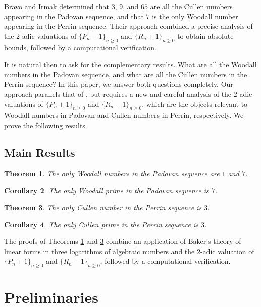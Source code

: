 \documentclass[11pt,a4paper]{article}
\newtheorem{theorem}{Theorem}[section]
\newtheorem{cor}[theorem]{Corollary}
\numberwithin{equation}{section}
\numberwithin{table}{section}
\numberwithin{figure}{section}
\begin{document}
Bravo and Irmak \cite{BrIrmak} determined that $3$, $9$, and $65$ are all the Cullen numbers appearing in the Padovan sequence, and that $7$ is the only Woodall number appearing in the Perrin sequence. Their approach combined a precise analysis of the $2$-adic valuations of 
$\{P_n - 1\}_{n\ge 0}$ and $\{R_n + 1\}_{n \ge 0}$ to obtain absolute bounds, followed by a computational verification.

It is natural then to ask for the complementary results. What are all the Woodall numbers in the Padovan sequence, and what are all the Cullen numbers in the Perrin sequence? In this paper, we answer both questions completely. Our approach parallels that of 
\cite{BrIrmak}, but requires a new and careful analysis of the $2$-adic valuations of $\{P_n + 1\}_{n\ge 0}$ and $\{R_n - 1\}_{n\ge 0}$, which 
are the objects relevant to Woodall numbers in Padovan and Cullen numbers in Perrin, respectively. We prove the following results.

\subsection{Main Results}

\begin{theorem}\label{thm:1}
	The only Woodall numbers in the Padovan sequence are $1$ and $7$.
\end{theorem}

\begin{cor}
The only Woodall prime in the Padovan sequence is $7$.
\end{cor}

\begin{theorem}\label{thm:2}
	The only Cullen number in the Perrin sequence is $3$.
\end{theorem}

\begin{cor}
The only Cullen prime in the Perrin sequence is $3$.
\end{cor}

The proofs of Theorems \ref{thm:1} and \ref{thm:2} combine an application of Baker's theory of linear forms in three logarithms of algebraic numbers and the $2$-adic valuation of $\{P_n + 1\}_{n\ge 0}$ and $\{R_n - 1\}_{n\ge 0}$, followed by a computational verification.

\section{Preliminaries}
\end{document}
